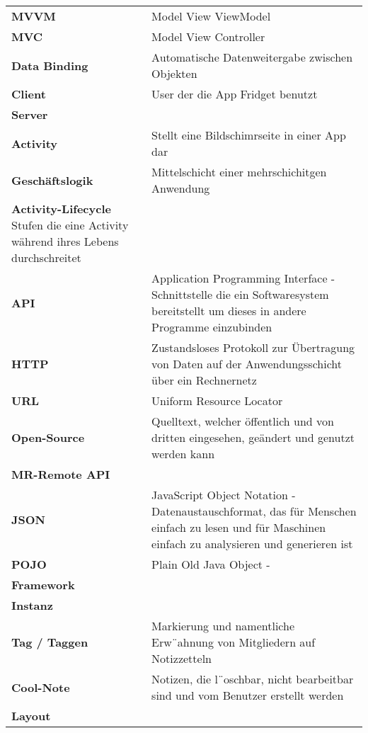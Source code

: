 \begin{table}[h!]
			\centering
			\label{my-label}
			\begin{tabular}{p{4cm}p{10cm}}
				\textbf{MVVM} & Model View ViewModel  \\
				\textbf{MVC} & Model View Controller  \\
				\textbf{Data Binding} & Automatische Datenweitergabe zwischen Objekten  \\
				\textbf{Client} & User der die App Fridget benutzt   \\
				
				\textbf{Server} &     \\
				\textbf{Activity} & Stellt eine Bildschimrseite in einer App dar   \\
				\textbf{Geschäftslogik} & Mittelschicht einer mehrschichitgen Anwendung  \\
				\textbf{Activity-Lifecycle} Stufen die eine Activity während ihres Lebens durchschreitet   \\
				
				\textbf{API} & Application Programming Interface - Schnittstelle die ein Softwaresystem bereitstellt um dieses in andere Programme einzubinden  \\
				
			
				\textbf{HTTP} & Zustandsloses Protokoll zur Übertragung von Daten auf der Anwendungsschicht über ein Rechnernetz  \\
				\textbf{URL} & Uniform Resource Locator  \\
				\textbf{Open-Source} & Quelltext, welcher öffentlich und von dritten eingesehen, geändert und genutzt werden kann  \\
				
				\textbf{MR-Remote API} &   \\ \todo{RAUS??}
				\textbf{JSON} & JavaScript Object Notation - Datenaustauschformat, das für Menschen einfach zu lesen und für Maschinen einfach zu analysieren und generieren ist   \\
				\textbf{POJO} & Plain Old Java Object  -   \\
				\textbf{Framework} &   \\
				
				\textbf{Instanz} &   \\
				\textbf{Tag / Taggen} &  Markierung und namentliche Erw¨ahnung von Mitgliedern auf Notizzetteln
   \\
				\textbf{Cool-Note} & Notizen, die l¨oschbar, nicht bearbeitbar sind und vom Benutzer erstellt werden   \\
				\textbf{Layout} &   \\
				

\end{tabular}
\end{table}
